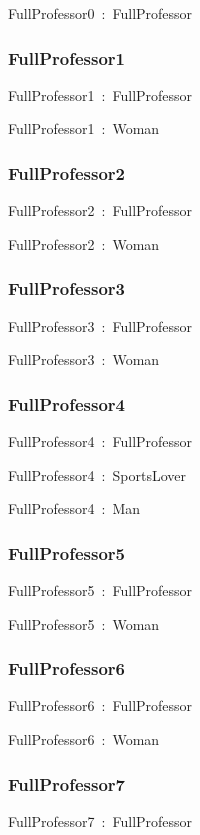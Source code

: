 \documentclass{article}
\begin{document}
FullProfessor0~:~FullProfessor

\subsubsection*{FullProfessor1}

FullProfessor1~:~FullProfessor

FullProfessor1~:~Woman

\subsubsection*{FullProfessor2}

FullProfessor2~:~FullProfessor

FullProfessor2~:~Woman

\subsubsection*{FullProfessor3}

FullProfessor3~:~FullProfessor

FullProfessor3~:~Woman

\subsubsection*{FullProfessor4}

FullProfessor4~:~FullProfessor

FullProfessor4~:~SportsLover

FullProfessor4~:~Man

\subsubsection*{FullProfessor5}

FullProfessor5~:~FullProfessor

FullProfessor5~:~Woman

\subsubsection*{FullProfessor6}

FullProfessor6~:~FullProfessor

FullProfessor6~:~Woman

\subsubsection*{FullProfessor7}

FullProfessor7~:~FullProfessor
\end{document}

